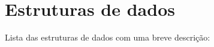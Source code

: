 \section{Estruturas de dados}
Lista das estruturas de dados com uma breve descrição\+:\begin{DoxyCompactList}
\item{}
\item{}
\end{DoxyCompactList}
